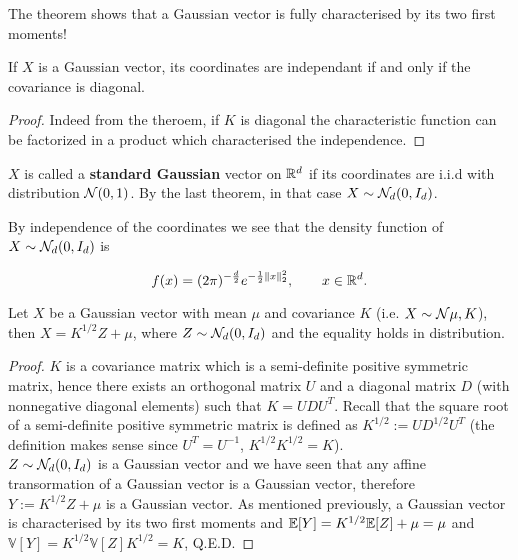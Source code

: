 \documentclass{article}
\begin{document}
The theorem shows that a Gaussian vector is fully characterised by its two first
moments!

\begin{corollary}
  If $X$ is a Gaussian vector, its coordinates are independant if and only if
  the covariance is diagonal. 
\end{corollary}

\begin{proof}
  Indeed from the theroem, if $K$ is diagonal the characteristic function can be
  factorized in a product which characterised the independence. 
\end{proof}

\begin{definition}
  $X$ is called a \textbf{standard Gaussian} vector on $\mathbb{R}^{d}$ if its coordinates are i.i.d with distribution
  $\mathcal{N}(0,1)$. By the last theorem, in that case $X \sim \mathcal{N}_d(0,I_d)$.
\end{definition}

By independence of the coordinates we see that the
density function of $X \sim \mathcal{N}_d(0,I_d)$ is

$$f(x)=(2 \pi)^{-\frac{d}{2}} e^{-\frac{1}{2}\|x\|_2^{2}}, \qquad x \in \mathbb{R}^{d}.$$

\begin{theorem}
  Let $X$ be a Gaussian vector with mean $\mu$ and covariance $K$ (i.e. $X \sim \mathcal{N}{\mu,K}$), then $X =
  K^{1/2}Z + \mu$, where $Z \sim \mathcal{N}_d(0,I_d)$ and the equality holds in
  distribution. 
\end{theorem}

\begin{proof}
  $K$ is a covariance matrix which is a semi-definite positive symmetric matrix,
  hence there exists an orthogonal matrix $U$ and a diagonal matrix $D$ (with nonnegative diagonal
  elements) such that $K = UDU^T$. Recall that the square root of a
  semi-definite positive symmetric matrix is defined as $K^{1/2}:= UD^{1/2}U^T$ (the
  definition makes sense since $U^T = U^{-1}$, $K^{1/2}K^{1/2} = K$).\\
  $Z \sim \mathcal{N}_d(0,I_d)$ is a Gaussian vector and we have seen that any affine transormation of a
  Gaussian vector is a Gaussian vector, therefore $Y:= K^{1/2}Z + \mu$ is a
  Gaussian vector. As mentioned previously, a Gaussian vector is characterised
  by its two first moments and $\mathbb{E}[Y] =K^{1/2}\mathbb{E}[Z]+\mu = \mu$ and $\mathbb{V}[Y] =
  K^{1/2}\mathbb{V}[Z]K^{1/2} = K$, Q.E.D.
\end{proof}
\end{document}
